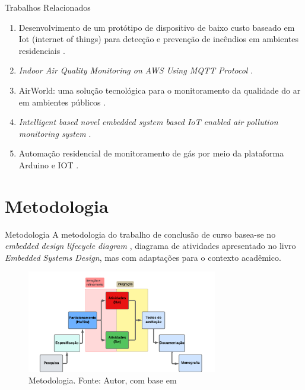 \documentclass[12pt]{beamer}
\begin{document}
    \begin{frame}{Trabalhos Relacionados}
        \begin{enumerate}
            \item Desenvolvimento de um protótipo de dispositivo de baixo custo baseado em Iot (internet of things) para detecção e prevenção de incêndios em ambientes residenciais \cite{uea-iot-deteccao-incendio}.
            \item \textit{Indoor Air Quality Monitoring on AWS Using MQTT Protocol} \cite{iot-monitoring-on-aws}.
            \item AirWorld: uma solução tecnológica para o monitoramento da qualidade do ar em ambientes públicos \cite{UFAMAirWorld}.
            \item \textit{Intelligent based novel embedded system based IoT enabled
            air pollution monitoring system} \cite{tbRelacionado4NovelEmbeddedSystem}.
            \item Automação residencial de monitoramento de gás por meio da plataforma Arduino e IOT \cite{alexandre-automaccao-formulas-de-leitura-sensor}.
        \end{enumerate}
    \end{frame}

    \section{Metodologia}

    \begin{frame}{Metodologia}
        A metodologia do trabalho de conclusão de curso basea-se no \textit{embedded design lifecycle diagram} \cite{system-design-IOT}, diagrama de atividades 
        apresentado no livro \textit{Embedded Systems Design}, mas com adaptações para o contexto acadêmico.

        \begin{figure}[ht]
            \centering
            \includegraphics[width=0.74\textwidth]{img/diagrama-metodologia.png}
            \caption{Metodologia. Fonte: Autor, com base em \cite{system-design-IOT}}\label{fig:metodologia}
        \end{figure}
    \end{frame}
\end{document}
